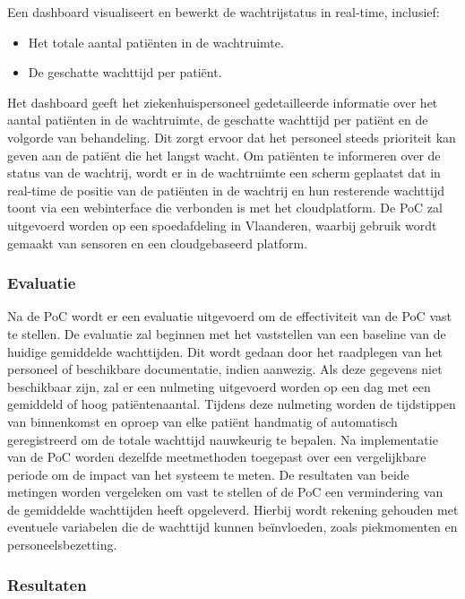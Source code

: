 Een dashboard visualiseert en bewerkt de wachtrijstatus in real-time, inclusief:

\begin{itemize}
    \item Het totale aantal patiënten in de wachtruimte.
    \item De geschatte wachttijd per patiënt.
\end{itemize}

Het dashboard geeft het ziekenhuispersoneel gedetailleerde informatie over het aantal patiënten in de wachtruimte, de geschatte wachttijd per patiënt en de volgorde van behandeling. Dit zorgt ervoor dat het personeel steeds prioriteit kan geven aan de patiënt die het langst wacht. Om patiënten te informeren over de status van de wachtrij, wordt er in de wachtruimte een scherm geplaatst dat in real-time de positie van de patiënten in de wachtrij en hun resterende wachttijd toont via een webinterface die verbonden is met het cloudplatform. De PoC zal uitgevoerd worden op een spoedafdeling in Vlaanderen, waarbij gebruik wordt gemaakt van sensoren en een cloudgebaseerd platform.

\subsubsection*{Evaluatie}
Na de PoC wordt er een evaluatie uitgevoerd om de effectiviteit van de PoC vast te stellen. De evaluatie zal beginnen met het vaststellen van een baseline van de huidige gemiddelde wachttijden. Dit wordt gedaan door het raadplegen van het personeel of beschikbare documentatie, indien aanwezig. Als deze gegevens niet beschikbaar zijn, zal er een nulmeting uitgevoerd worden op een dag met een gemiddeld of hoog patiëntenaantal. Tijdens deze nulmeting worden de tijdstippen van binnenkomst en oproep van elke patiënt handmatig of automatisch geregistreerd om de totale wachttijd nauwkeurig te bepalen. Na implementatie van de PoC worden dezelfde meetmethoden toegepast over een vergelijkbare periode om de impact van het systeem te meten. De resultaten van beide metingen worden vergeleken om vast te stellen of de PoC een vermindering van de gemiddelde wachttijden heeft opgeleverd. Hierbij wordt rekening gehouden met eventuele variabelen die de wachttijd kunnen beïnvloeden, zoals piekmomenten en personeelsbezetting.

\subsubsection*{Resultaten}

